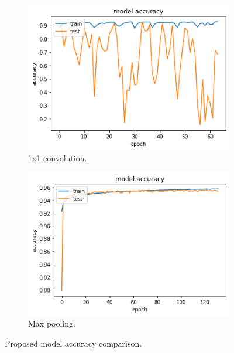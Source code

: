 \documentclass{article}
\begin{document}
\begin{figure}[H]
	\centering
	\begin{subfigure}{.5\textwidth}
		\centering
		\includegraphics[width=.9\linewidth]{./images/poly/new model_acc.png}
		\caption{1x1 convolution.}
	\end{subfigure}%
	\begin{subfigure}{.5\textwidth}
		\centering
		\includegraphics[width=.9\linewidth]{./images/poly/new model_acc_new.png}
		\caption{Max pooling.}
	\end{subfigure}
	\caption{Proposed model accuracy comparison.}
	\label{fig:poly_new_acc}
\end{figure}
\end{document}
